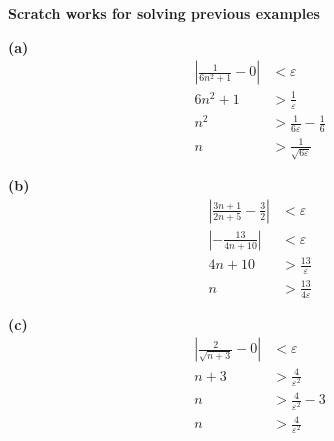 \documentclass[12pt]{article}
\begin{document}
\begin{note}
    \textbf{Scratch works for solving previous examples} \\
    \begin{minipage}{0.3\textwidth}
        \textbf{(a)}
        \begin{align*}
            \left| \frac{1}{6n^2+1} - 0 \right| &< \varepsilon \\
            6n^2+1 &> \frac{1}{\varepsilon} \\
            n^2 &> \frac{1}{6\varepsilon} - \frac{1}{6} \\
            n &> \frac{1}{\sqrt{6\varepsilon}}
        \end{align*}
    \end{minipage}
    \begin{minipage}{0.33\textwidth}
        \textbf{(b)}
        \begin{align*}
            \left| \frac{3n+1}{2n+5} - \frac{3}{2} \right| &< \varepsilon \\
            \left| -\frac{13}{4n+10} \right| &< \varepsilon \\
            4n+10 &> \frac{13}{\varepsilon} \\
            n &> \frac{13}{4\varepsilon}
        \end{align*}
    \end{minipage}
    \begin{minipage}{0.33\textwidth}
        \textbf{(c)}
        \begin{align*}
            \left| \frac{2}{\sqrt{n+3}} - 0 \right| &< \varepsilon \\
            n + 3 &> \frac{4}{\varepsilon^2} \\
            n &> \frac{4}{\varepsilon^2} - 3 \\
            n &> \frac{4}{\varepsilon^2}
        \end{align*}
    \end{minipage}
\end{note}


\end{document}
